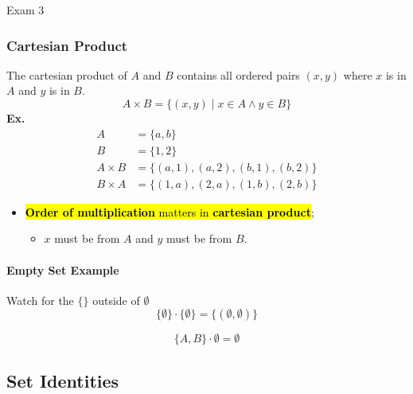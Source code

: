 \documentclass{note}
\newcommand{\ex}{\textbf{Ex.} }
\begin{document}
\begin{note}{Exam 3}
        \subsubsection{Cartesian Product}
        The cartesian product of $ A $ and $ B $ contains all ordered pairs $ \left(x, y \right) $ where $ x $ is in
        $ A $ and $ y $ is in $ B $.
        \begin{equation}\label{eq: cartesian product}
            A \times B = \{ \left( x,y \right) \mid x \in A \wedge y \in B \}
        \end{equation}
        \ex
        \begin{align*}
            A &= \{a, b \}\\
            B &= \{1, 2 \}\\
            A \times B &= \{ (a,1), (a,2), (b,1), (b,2) \}\\
            B \times A &= \{ (1,a), (2,a), (1,b), (2,b) \}
        \end{align*}

        \begin{itemize}
            \item \hl{\textbf{Order of multiplication} matters in \textbf{cartesian product}};
            \begin{itemize}
                \item $ x $ must be from  $ A $ and $ y $ must be from $ B $.
            \end{itemize}
        \end{itemize}

        \paragraph{Empty Set Example}

        Watch for the $ \{ \} $ outside of $ \emptyset $
        \begin{displaymath}
            \{ \emptyset \} \cdot \{ \emptyset \}  = \{ \left(\emptyset, \emptyset \right) \}
        \end{displaymath}

        \begin{displaymath}
            \{ A, B \} \cdot \emptyset = \emptyset
        \end{displaymath}

        \subsection{Set Identities}


\end{note}
\end{document}
